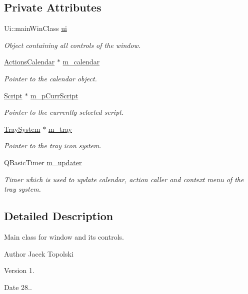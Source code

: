 \subsection*{Private Attributes}
\begin{DoxyCompactItemize}
\item 
Ui\-::main\-Win\-Class \hyperlink{classmain_win_a89fa9d3006573378f3195845fe9ed408}{ui}
\begin{DoxyCompactList}\small\item\em Object containing all controls of the window. \end{DoxyCompactList}\item 
\hyperlink{class_actions_calendar}{Actions\-Calendar} $\ast$ \hyperlink{classmain_win_a6aea2ca54243cf5eafad64ab548766d8}{m\-\_\-calendar}
\begin{DoxyCompactList}\small\item\em Pointer to the calendar object. \end{DoxyCompactList}\item 
\hyperlink{class_script}{Script} $\ast$ \hyperlink{classmain_win_ab391602112d6c25f237da91eae815d47}{m\-\_\-p\-Curr\-Script}
\begin{DoxyCompactList}\small\item\em Pointer to the currently selected script. \end{DoxyCompactList}\item 
\hyperlink{class_tray_system}{Tray\-System} $\ast$ \hyperlink{classmain_win_a13f687f63460e13e6a4819ea1496a2f0}{m\-\_\-tray}
\begin{DoxyCompactList}\small\item\em Pointer to the tray icon system. \end{DoxyCompactList}\item 
Q\-Basic\-Timer \hyperlink{classmain_win_a079d09aeafe1af36f8f0d1bd4d88d803}{m\-\_\-updater}
\begin{DoxyCompactList}\small\item\em Timer which is used to update calendar, action caller and context menu of the tray system. \end{DoxyCompactList}\end{DoxyCompactItemize}


\subsection{Detailed Description}
Main class for window and its controls. 

\begin{DoxyAuthor}{Author}
Jacek Topolski 
\end{DoxyAuthor}
\begin{DoxyVersion}{Version}
1. 
\end{DoxyVersion}
\begin{DoxyDate}{Date}
28.. 
\end{DoxyDate}


